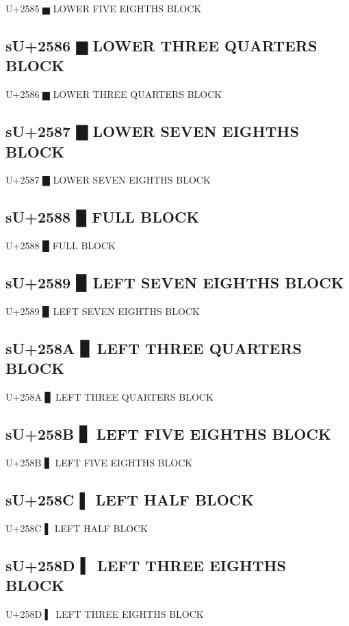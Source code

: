 U+2585 ▅ LOWER FIVE EIGHTHS BLOCK

\subsection{sU+2586 ▆ LOWER THREE QUARTERS BLOCK}

U+2586 ▆ LOWER THREE QUARTERS BLOCK

\subsection{sU+2587 ▇ LOWER SEVEN EIGHTHS BLOCK}

U+2587 ▇ LOWER SEVEN EIGHTHS BLOCK

\subsection{sU+2588 █ FULL BLOCK}

U+2588 █ FULL BLOCK

\subsection{sU+2589 ▉ LEFT SEVEN EIGHTHS BLOCK}

U+2589 ▉ LEFT SEVEN EIGHTHS BLOCK

\subsection{sU+258A ▊ LEFT THREE QUARTERS BLOCK}

U+258A ▊ LEFT THREE QUARTERS BLOCK

\subsection{sU+258B ▋ LEFT FIVE EIGHTHS BLOCK}

U+258B ▋ LEFT FIVE EIGHTHS BLOCK

\subsection{sU+258C ▌ LEFT HALF BLOCK}

U+258C ▌ LEFT HALF BLOCK

\subsection{sU+258D ▍ LEFT THREE EIGHTHS BLOCK}

U+258D ▍ LEFT THREE EIGHTHS BLOCK

